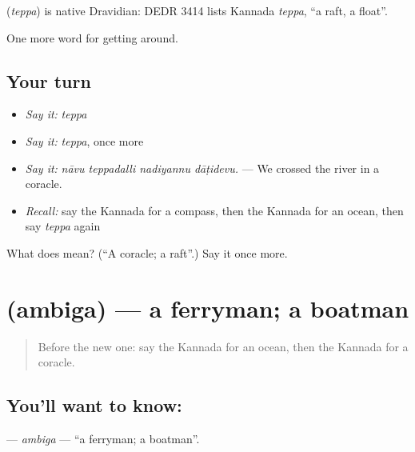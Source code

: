 \begin{cousinweb}
\textbf{} (\emph{teppa}) is native Dravidian: DEDR 3414 lists Kannada \emph{teppa}, \textquotedblleft{}a raft, a float\textquotedblright{}.
\end{cousinweb}

\begin{grammarlens}[title={What you've built}]
One more word for getting around.
\end{grammarlens}

\subsection*{Your turn}
\begin{itemize}
\raggedright
  \item \emph{Say it:} \emph{teppa}
  \item \emph{Say it:} \emph{teppa}, once more
  \item \emph{Say it:} \emph{nāvu teppadalli nadiyannu dāṭidevu.} — We crossed the river in a coracle.
  \item \emph{Recall:} say the Kannada for a compass, then the Kannada for an ocean, then say \emph{teppa} again
\end{itemize}

\begin{tcolorbox}[breakable,colback=teal!4,colframe=teal!35!black,title={Before you move on}]
What does  mean? (\textquotedblleft{}A coracle; a raft\textquotedblright{}.) Say it once more.
\end{tcolorbox}
\section[\texorpdfstring{\kn{ಅಂಬಿಗ} (ambiga)}{ಅಂಬಿಗ (ambiga)}]{ (ambiga) — a ferryman; a boatman}

\label{lesson:KA-C454-ambiga}



\begin{quote}
Before the new one: say the Kannada for an ocean, then the Kannada for a coracle.
\end{quote}

\subsection*{You'll want to know: }
\textbf{} — \emph{ambiga} — \textquotedblleft{}a ferryman; a boatman\textquotedblright{}.

